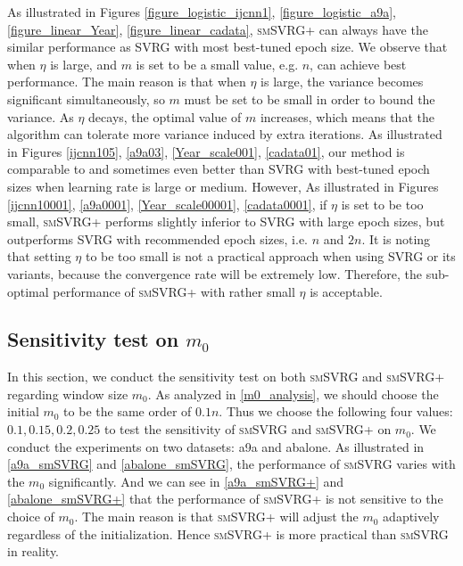 \documentclass[conference]{IEEEtran}
\begin{document}
As illustrated in Figures \ref{figure_logistic_ijcnn1}, \ref{figure_logistic_a9a}, \ref{figure_linear_Year}, \ref{figure_linear_cadata},  \textsc{smSVRG+} can always have the similar performance as SVRG with most best-tuned epoch size. We observe that when $\eta$ is large,  and $m$ is set to be a small value, e.g. $n$, can achieve best performance. The main reason is that when $\eta$ is large, the variance becomes significant simultaneously, so $m$ must be set to be small in order to bound the variance. As $\eta$ decays, the optimal value of $m$ increases, which means that the algorithm can tolerate more variance induced by extra iterations. As illustrated in Figures \ref{ijcnn105}, \ref{a9a03}, \ref{Year_scale001}, \ref{cadata01}, our method is comparable to and sometimes even better than SVRG with best-tuned epoch sizes when learning rate is large or medium. However, As illustrated in Figures \ref{ijcnn10001}, \ref{a9a0001}, \ref{Year_scale00001}, \ref{cadata0001}, if $\eta$ is set to be too small, \textsc{smSVRG+} performs slightly inferior to  SVRG with large epoch sizes, but outperforms SVRG with recommended epoch sizes, i.e. $n$ and $2n$. It is noting that setting $\eta$ to be too small is not a practical approach when using SVRG or its variants, because the convergence rate will be extremely low. Therefore, the sub-optimal performance of \textsc{smSVRG+} with rather small $\eta$ is acceptable.
 
\subsection{Sensitivity test on $m_0$}
In this section, we conduct the sensitivity test on both \textsc{smSVRG} and \textsc{smSVRG+} regarding window size $m_0$. As analyzed in \ref{m0_analysis}, we should choose the initial $m_0$ to be the same order of $0.1n$. Thus we choose the following four values: $0.1, 0.15, 0.2, 0.25$ to test the sensitivity of \textsc{smSVRG} and \textsc{smSVRG+} on $m_0$. We conduct the experiments on two datasets: a9a and abalone. As illustrated in \ref{a9a_smSVRG} and \ref{abalone_smSVRG}, the performance of \textsc{smSVRG} varies with the $m_0$ significantly. And we can see in \ref{a9a_smSVRG+} and \ref{abalone_smSVRG+} that the performance of \textsc{smSVRG+} is not sensitive to the choice of $m_0$. The main reason is that \textsc{smSVRG+} will adjust the $m_0$ adaptively regardless of the initialization. 
Hence \textsc{smSVRG+} is more practical than \textsc{smSVRG} in reality.
\end{document}
